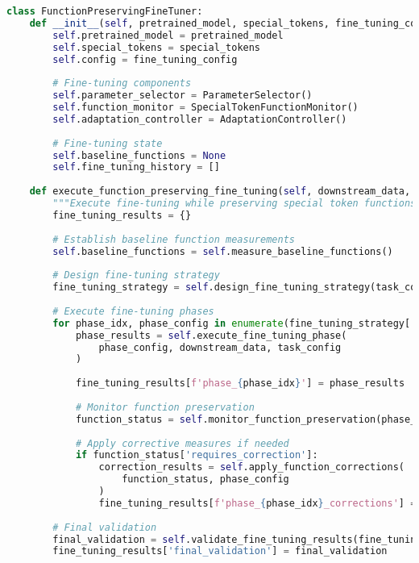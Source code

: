 \begin{lstlisting}[language=Python, caption=Function-preserving fine-tuning framework]
class FunctionPreservingFineTuner:
    def __init__(self, pretrained_model, special_tokens, fine_tuning_config):
        self.pretrained_model = pretrained_model
        self.special_tokens = special_tokens
        self.config = fine_tuning_config
        
        # Fine-tuning components
        self.parameter_selector = ParameterSelector()
        self.function_monitor = SpecialTokenFunctionMonitor()
        self.adaptation_controller = AdaptationController()
        
        # Fine-tuning state
        self.baseline_functions = None
        self.fine_tuning_history = []
        
    def execute_function_preserving_fine_tuning(self, downstream_data, task_config):
        """Execute fine-tuning while preserving special token functions."""
        fine_tuning_results = {}
        
        # Establish baseline function measurements
        self.baseline_functions = self.measure_baseline_functions()
        
        # Design fine-tuning strategy
        fine_tuning_strategy = self.design_fine_tuning_strategy(task_config)
        
        # Execute fine-tuning phases
        for phase_idx, phase_config in enumerate(fine_tuning_strategy['phases']):
            phase_results = self.execute_fine_tuning_phase(
                phase_config, downstream_data, task_config
            )
            
            fine_tuning_results[f'phase_{phase_idx}'] = phase_results
            
            # Monitor function preservation
            function_status = self.monitor_function_preservation(phase_results)
            
            # Apply corrective measures if needed
            if function_status['requires_correction']:
                correction_results = self.apply_function_corrections(
                    function_status, phase_config
                )
                fine_tuning_results[f'phase_{phase_idx}_corrections'] = correction_results
        
        # Final validation
        final_validation = self.validate_fine_tuning_results(fine_tuning_results)
        fine_tuning_results['final_validation'] = final_validation
        

\end{lstlisting}
